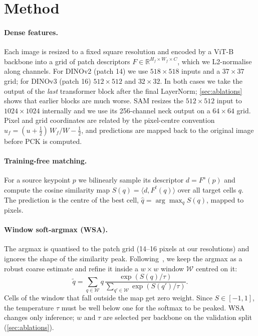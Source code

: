 \section{Method}
\label{sec:method}

\paragraph{Dense features.}
Each image is resized to a fixed square resolution and encoded by a ViT-B backbone into a grid of patch descriptors $F\in\mathbb{R}^{H_f\times W_f\times C}$, which we L2-normalise along channels. For DINOv2 (patch 14) we use $518\times518$ inputs and a $37\times37$ grid; for DINOv3 (patch 16) $512\times512$ and $32\times32$. In both cases we take the output of the \emph{last} transformer block after the final LayerNorm; \cref{sec:ablations} shows that earlier blocks are much worse. SAM resizes the $512\times512$ input to $1024\times1024$ internally and we use its 256-channel neck output on a $64\times64$ grid. Pixel and grid coordinates are related by the pixel-centre convention $u_f=(u+\tfrac12)\,W_f/W-\tfrac12$, and predictions are mapped back to the original image before PCK is computed.

\paragraph{Training-free matching.}
For a source keypoint $p$ we bilinearly sample its descriptor $d=F^s(p)$ and compute the cosine similarity map $S(q)=\langle d, F^t(q)\rangle$ over all target cells $q$. The prediction is the centre of the best cell, $\hat q=\arg\max_q S(q)$, mapped to pixels.

\paragraph{Window soft-argmax (WSA).}
The argmax is quantised to the patch grid (14--16 pixels at our resolutions) and ignores the shape of the similarity peak. Following~\cite{zhang2024telling}, we keep the argmax as a robust coarse estimate and refine it inside a $w\times w$ window $\mathcal{W}$ centred on it:
\begin{equation}
    \tilde q=\sum_{q\in\mathcal{W}} q\,\frac{\exp(S(q)/\tau)}{\sum_{q'\in\mathcal{W}}\exp(S(q')/\tau)}.
    \label{eq:wsa}
\end{equation}
Cells of the window that fall outside the map get zero weight. Since $S\in[-1,1]$, the temperature $\tau$ must be well below one for the softmax to be peaked. WSA changes only inference; $w$ and $\tau$ are selected per backbone on the validation split (\cref{sec:ablations}).


